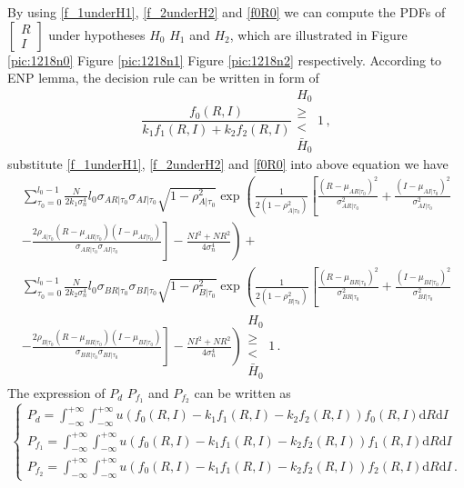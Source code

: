 By using \eqref{f_1underH1}, \eqref{f_2underH2} and \eqref{f0R0} we can compute the PDFs of  $\begin{bmatrix}
  R \\
  I
\end{bmatrix}$ under hypotheses $H_0$ $H_1$ and $H_2$, which are illustrated in Figure \ref{pic:1218n0} Figure \ref{pic:1218n1} Figure \ref{pic:1218n2} respectively. 
According to ENP lemma, the decision rule can be written in form of 
\begin{equation}
  \frac{f_0(R,I)}{k_1f_1(R,I)+k_2f_2(R,I)} \substack{H_0 \\ \geq \\ < \\ \bar{H}_0}1\,,
\end{equation}
substitute \eqref{f_1underH1}, \eqref{f_2underH2} and \eqref{f0R0} into above equation we have 
\begin{equation}
\begin{split}
\sum_{\tau_0=0}^{l_0-1}\frac{N}{2k_1\sigma_n^4}l_0\sigma_{AR|\tau_0}\sigma_{AI|\tau_0}\sqrt{1-\rho_{A|\tau_0}^2}\exp\left(\frac{1}{2(1-\rho_{A|\tau_0}^2)}\left[ \frac{(R-\mu_{AR|\tau_0})^2}{\sigma_{AR|\tau_0}^2}+\frac{(I-\mu_{AI|\tau_0})^2}{\sigma_{AI|\tau_0}^2} \right. \right. \\
\left. \left.  - \frac{2\rho_{A|\tau_0}(R-\mu_{AR|\tau_0})(I-\mu_{AI|\tau_0})}{\sigma_{AR|\tau_0}\sigma_{AI|\tau_0}} \right] -\frac{NI^2+NR^2}{4\sigma_n^4}\right)
+\\
\sum_{\tau_0=0}^{l_0-1}\frac{N}{2k_2\sigma_n^4}l_0\sigma_{BR|\tau_0}\sigma_{BI|\tau_0}\sqrt{1-\rho_{B|\tau_0}^2}\exp\left(
\frac{1}{2(1-\rho_{B|\tau_0}^2)}\left[ \frac{(R-\mu_{BR|\tau_0})^2}{\sigma_{BR|\tau_0}^2}+\frac{(I-\mu_{BI|\tau_0})^2}{\sigma_{BI|\tau_0}^2} \right. \right. \\
\left. \left. - \frac{2\rho_{B|\tau_0}(R-\mu_{BR|\tau_0})(I-\mu_{BI|\tau_0})}{\sigma_{BR|\tau_0}\sigma_{BI|\tau_0}}  
\right] -\frac{NI^2+NR^2}{4\sigma_n^4}
\right) \substack{H_0 \\ \geq \\ < \\ \bar{H}_0}1\,.
\end{split}
\end{equation}
The expression of $P_d$ $P_{f_1}$ and $P_{f_2}$ can be written as
\begin{equation}
  \begin{cases}
    P_d = \int_{-\infty}^{+\infty}\int_{-\infty}^{+\infty} u(f_0(R,I) - k_1f_1(R,I) - k_2f_2(R,I))f_0(R,I)\mathrm{d}R\mathrm{d}I\\ 
	P_{f_1} = \int_{-\infty}^{+\infty}\int_{-\infty}^{+\infty} u(f_0(R,I) - k_1f_1(R,I) - k_2f_2(R,I))f_1(R,I)\mathrm{d}R\mathrm{d}I\\
	P_{f_2} = \int_{-\infty}^{+\infty}\int_{-\infty}^{+\infty} u(f_0(R,I) - k_1f_1(R,I) - k_2f_2(R,I))f_2(R,I)\mathrm{d}R\mathrm{d}I\,. 
  \end{cases}
  \label{asdffghj}
\end{equation}

